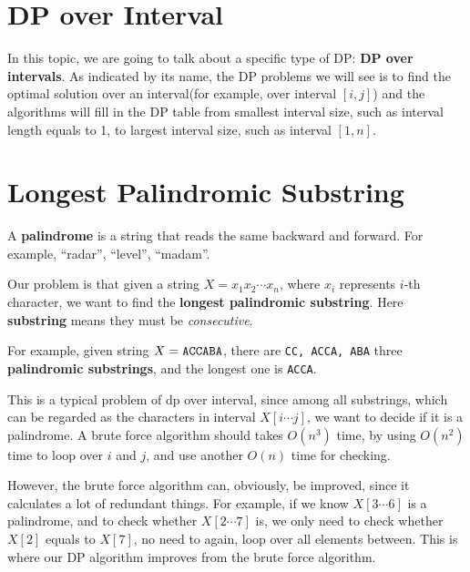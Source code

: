 \begin{spacing}{1.3}
   
    \section{DP over Interval}

    In this topic, we are going to talk about a specific type of DP: 
    {\bf DP over intervals}. As indicated by its name, the DP problems we will see 
    is to find the optimal solution over an interval(for example, over interval $[i,j]$)
    and the algorithms will fill in the DP table from smallest interval size, such as 
    interval length equals to 1, to largest interval size, such as interval $[1,n]$.


    \vspace{0.3in}
    \section{Longest Palindromic Substring}

    \begin{definition}
        A {\bf palindrome} is a string that reads the same backward and forward.
        For example, ``radar'', ``level'', ``madam''.
    \end{definition}

    Our problem is that given a string $X=x_1x_2\cdots x_n$, where $x_i$ represents $i$-th 
    character, we want to find the {\bf longest palindromic substring}. 
    Here {\bf substring} means they must be {\it consecutive}.

    For example, given string $X={\tt ACCABA}$, there are {\tt CC, ACCA, ABA} 
    three {\bf palindromic substrings}, and the longest one is {\tt ACCA}.

    This is a typical problem of dp over interval, since among all substrings, which 
    can be regarded as the characters in interval $X[i\cdots j]$, we want to decide 
    if it is a palindrome. A brute force algorithm should takes $O(n^3)$ time, 
    by using $O(n^2)$ time to loop over $i$ and $j$, and use another $O(n)$ time for 
    checking.

    However, the brute force algorithm can, obviously, be improved, since 
    it calculates a lot of redundant things. For example, if we know $X[3\cdots 6]$
    is a palindrome, and to check whether $X[2\cdots 7]$ is, we only need 
    to check whether $X[2]$ equals to $X[7]$, no need to again, loop over all elements
    between. This is where our DP algorithm improves from the brute force algorithm.


\end{spacing}
